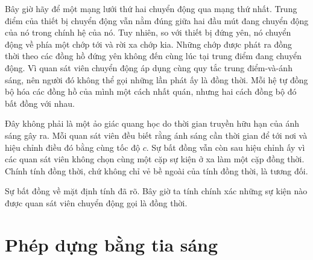 Bây giờ hãy để một mạng lưới thứ hai chuyển động qua mạng thứ nhất. Trung điểm của thiết bị chuyển động vẫn nằm đúng giữa hai đầu mút đang chuyển động của nó trong chính hệ của nó. Tuy nhiên, so với thiết bị đứng yên, nó chuyển động về phía một chớp tới và rời xa chớp kia. Những chớp được phát ra đồng thời theo các đồng hồ đứng yên không đến cùng lúc tại trung điểm đang chuyển động. Vì quan sát viên chuyển động áp dụng cùng quy tắc trung điểm-và-ánh sáng, nên người đó không thể gọi những lần phát ấy là đồng thời. Mỗi hệ tự đồng bộ hóa các đồng hồ của mình một cách nhất quán, nhưng hai cách đồng bộ đó bất đồng với nhau.

Đây không phải là một ảo giác quang học do thời gian truyền hữu hạn của ánh sáng gây ra. Mỗi quan sát viên đều biết rằng ánh sáng cần thời gian để tới nơi và hiệu chỉnh điều đó bằng cùng tốc độ \(c\). Sự bất đồng vẫn còn sau hiệu chỉnh ấy vì các quan sát viên không chọn cùng một cặp sự kiện ở xa làm một cặp đồng thời. Chính tính đồng thời, chứ không chỉ vẻ bề ngoài của tính đồng thời, là tương đối.

\begin{classroomqa}
\end{classroomqa}

Sự bất đồng về mặt định tính đã rõ. Bây giờ ta tính chính xác những sự kiện nào được quan sát viên chuyển động gọi là đồng thời.

\section{Phép dựng bằng tia sáng}

